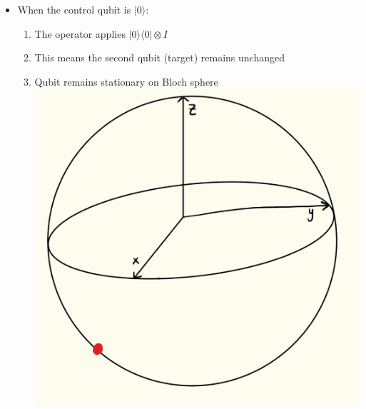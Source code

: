\documentclass[12pt]{article}
\begin{document}
\begin{itemize}
    \item When the control qubit is $|0\rangle$:
    \begin{enumerate}
        \item The operator applies $|0\rangle \langle 0| \otimes I$
        \item This means the second qubit (target) remains unchanged
        \item Qubit remains stationary on Bloch sphere
        \includegraphics[width=\textwidth]{case_one.jpeg}
    \end{enumerate}
\end{itemize}
\end{document}
